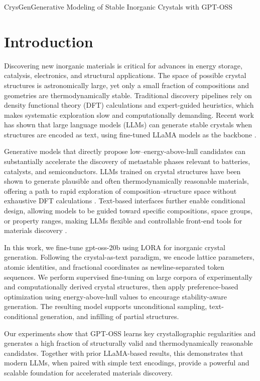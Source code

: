 \begin{teamsubmission}{CrysGen}{Generative Modeling of Stable Inorganic Crystals with GPT-OSS}
\section*{Introduction}
Discovering new inorganic materials is critical for advances in energy storage, catalysis, electronics, and structural applications. The space of possible crystal structures is astronomically large, yet only a small fraction of compositions and geometries are thermodynamically stable. Traditional discovery pipelines rely on density functional theory (DFT) calculations and expert-guided heuristics, which makes systematic exploration slow and computationally demanding. Recent work has shown that large language models (LLMs) can generate stable crystals when structures are encoded as text, using fine-tuned LLaMA models as the backbone \cite{gruver2024fine}.

Generative models that directly propose low–energy-above-hull candidates can substantially accelerate the discovery of metastable phases relevant to batteries, catalysts, and semiconductors. LLMs trained on crystal structures have been shown to generate plausible and often thermodynamically reasonable materials, offering a path to rapid exploration of composition–structure space without exhaustive DFT calculations \cite{gruver2024fine}. Text-based interfaces further enable conditional design, allowing models to be guided toward specific compositions, space groups, or property ranges, making LLMs flexible and controllable front-end tools for materials discovery \cite{Antunes2024}.

In this work, we fine-tune gpt-oss-20b \cite{agarwal2025gpt} using LORA \cite{hu2022lora} for inorganic crystal generation. Following the crystal-as-text paradigm, we encode lattice parameters, atomic identities, and fractional coordinates as newline-separated token sequences. We perform supervised fine-tuning on large corpora of experimentally and computationally derived crystal structures, then apply preference-based optimization using energy-above-hull values to encourage stability-aware generation. The resulting model supports unconditional sampling, text-conditional generation, and infilling of partial structures.

Our experiments show that GPT-OSS learns key crystallographic regularities and generates a high fraction of structurally valid and thermodynamically reasonable candidates. Together with prior LLaMA-based results, this demonstrates that modern LLMs, when paired with simple text encodings, provide a powerful and scalable foundation for accelerated materials discovery.


\end{teamsubmission}
